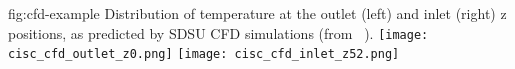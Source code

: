 \begin{dunefigure}{fig:cfd-example}
  {Distribution of temperature at the outlet (left) and inlet (right) z positions, as predicted by SDSU CFD simulations (from ~\cite{docdb-5915}). }
  \texttt{[image: cisc\_cfd\_outlet\_z0.png]}
  \texttt{[image: cisc\_cfd\_inlet\_z52.png]}
\end{dunefigure}


  
